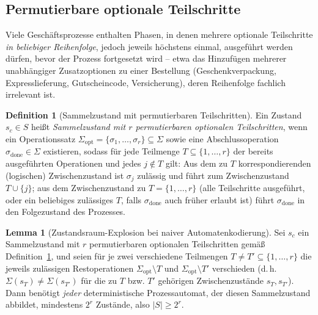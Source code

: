 ﻿\documentclass[a4paper,12pt]{article}
\theoremstyle{definition}
\newtheorem{definition}{Definition}
\newtheorem{lemma}{Lemma}
\begin{document}
\subsection{Permutierbare optionale Teilschritte}
\label{sec:permutierbar}

Viele Geschäftsprozesse enthalten Phasen, in denen mehrere optionale Teilschritte
\emph{in beliebiger Reihenfolge}, jedoch jeweils höchstens einmal, ausgeführt werden
dürfen, bevor der Prozess fortgesetzt wird -- etwa das Hinzufügen mehrerer unabhängiger
Zusatzoptionen zu einer Bestellung (Geschenkverpackung, Expresslieferung, Gutscheincode,
Versicherung), deren Reihenfolge fachlich irrelevant ist.

\begin{definition}[Sammelzustand mit permutierbaren Teilschritten]
	\label{def:sammelzustand}
	Ein Zustand $s_c \in S$ heißt \emph{Sammelzustand mit $r$ permutierbaren optionalen
	Teilschritten}, wenn ein Operationssatz
	$\Sigma_{\mathrm{opt}} = \{\sigma_1,\ldots,\sigma_r\} \subseteq \Sigma$ sowie eine
	Abschlussoperation $\sigma_{\mathrm{done}} \in \Sigma$ existieren, sodass für jede
	Teilmenge $T \subseteq \{1,\ldots,r\}$ der bereits ausgeführten Operationen und jedes
	$j \notin T$ gilt: Aus dem zu $T$ korrespondierenden (logischen) Zwischenzustand ist
	$\sigma_j$ zulässig und führt zum Zwischenzustand $T \cup \{j\}$; aus dem
	Zwischenzustand zu $T=\{1,\ldots,r\}$ (alle Teilschritte ausgeführt, oder ein
	beliebiges zulässiges $T$, falls $\sigma_{\mathrm{done}}$ auch früher erlaubt ist)
	führt $\sigma_{\mathrm{done}}$ in den Folgezustand des Prozesses.
\end{definition}

\begin{lemma}[Zustandsraum-Explosion bei naiver Automatenkodierung]
	\label{lem:zustandsexplosion}
	Sei $s_c$ ein Sammelzustand mit $r$ permutierbaren optionalen Teilschritten gemäß
	Definition~\ref{def:sammelzustand}, und seien für je zwei verschiedene Teilmengen
	$T \neq T' \subseteq \{1,\ldots,r\}$ die jeweils zulässigen Restoperationen
	$\Sigma_{\mathrm{opt}} \setminus T$ und $\Sigma_{\mathrm{opt}} \setminus T'$
	verschieden (d.\,h. $\Sigma(s_T) \neq \Sigma(s_{T'})$ für die zu $T$ bzw. $T'$
	gehörigen Zwischenzustände $s_T,s_{T'}$). Dann benötigt \emph{jeder} deterministische
	Prozessautomat, der diesen Sammelzustand abbildet, mindestens $2^r$ Zustände, also
	$|S| \geq 2^r$.
\end{lemma}
\end{document}
